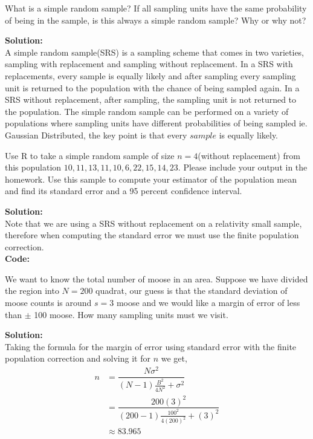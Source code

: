 \documentclass[12pt]{article}
\makeatletter
\theoremstyle{homework}
\newenvironment{exercise}[1]
{\def\@currentlabel{#1}\exercisecore}
{\endexercisecore}
\newcommand{\localhead}[1]{\par\smallskip\noindent\textbf{#1}\nobreak\\}%
\newcommand\solution{\localhead{Solution:}}
\makeatother
\begin{document}
\begin{exercise}{1} What is a simple random sample? If all sampling units have the same probability of being
    in the sample, is this always a simple random sample? Why or why not?\\
    \solution A simple random sample(SRS) is a sampling scheme that comes in two varieties, sampling with replacement 
    and sampling without replacement. In a SRS with replacements, every sample is equally likely and after sampling every sampling
    unit is returned to the population with the chance of being sampled again. In a SRS without replacement, after sampling, the sampling 
    unit is not returned to the population. The simple random sample can be performed on a variety of populations where sampling units have 
    different probabilities of being sampled ie. Gaussian Distributed, the key point is that every $sample$ is equally likely. 
\end{exercise}
\vspace{1in}

\begin{exercise}{2} Use R to take a simple random sample of size $n = 4$(without replacement) from this population
    $10,11,13,11,10,6,22,15,14,23$. Please include your output in the homework. Use this sample to compute your estimator of 
    the population mean and find its standard error and a 95 percent confidence interval.

    \solution Note that we are using a SRS without replacement on a relativity small sample, therefore when 
    computing the standard error we must use the finite population correction. \\
    \textbf{Code:}
    \begin{center}
        
    \end{center}
\end{exercise}
\vspace{1in}


\begin{exercise}{3} We want to know the total number of moose in an area. Suppose we have divided 
    the region into $N = 200$ quadrat, our guess is that the standard deviation of moose counts is around $s = 3$
    moose and we would like a margin of error of less than $\pm$ 100 moose. How many sampling units must we visit. \\
    \solution Taking the formula for the margin of error using standard error with the 
    finite population correction and solving it for $n$ we get, 
    \begin{align*}
        n &= \dfrac{N\sigma^2}{(N-1)\frac{B^2}{4N^2} + \sigma^2}\\
          &= \dfrac{200 (3)^2}{(200-1)\frac{100^2}{4 (200)^2} + (3)^2}\\
          &\approx 83.965
    \end{align*}
\end{exercise}
\vspace{1in}
\end{document}
